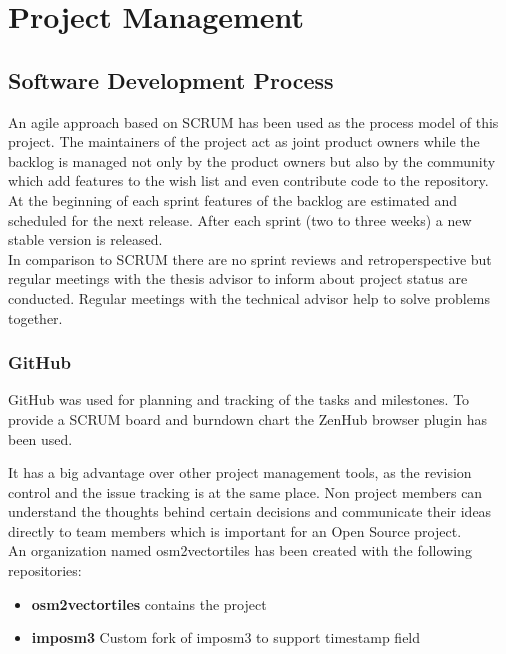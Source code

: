 \chapter{Project Management}\label{project-management}

\section{Software Development Process}


An agile approach based on SCRUM has been used as the process model of this project.
The maintainers of the project act as joint product owners while the backlog is managed not only
by the product owners but also by the community which add features to the wish list and even contribute code to the repository.\\
At the beginning of each sprint features of the backlog are estimated and scheduled for the next release. After each sprint (two to three weeks) a new stable version is released.\\
In comparison to SCRUM there are no sprint reviews and retroperspective but regular meetings with the thesis advisor to inform about project status are conducted.
Regular meetings with the technical advisor help to solve problems together.

\subsection*{GitHub}\label{github}
GitHub was used for planning and tracking of the tasks and milestones.
To provide a SCRUM board and burndown chart the ZenHub browser plugin has been used.


It has a big advantage over other project management tools, as the revision control and the issue tracking is at the same place.
Non project members can understand the thoughts behind certain decisions and communicate their ideas directly to team members which is important for an Open Source project.\\

An organization named osm2vectortiles has been created with the following repositories:

\begin{itemize}
\item
  \textbf{osm2vectortiles} contains the project
\item
  \textbf{imposm3} Custom fork of imposm3 to support timestamp field
\end{itemize}

